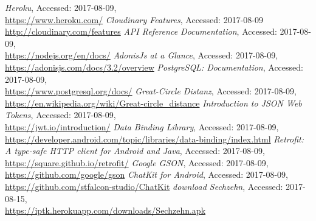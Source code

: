 \documentclass[11pt, accentcolor=tud1c]{tudreport}
\begin{document}
\begin{thebibliography}{9}
		\textit{Heroku}, 
		Accessed: 2017-08-09, \\
		\url{https://www.heroku.com/}
		\textit{Cloudinary Features}, 
		Accessed: 2017-08-09 \\
		\url{http://cloudinary.com/features}
		\textit{API Reference Documentation}, 
		Accessed: 2017-08-09, \\
		\url{https://nodejs.org/en/docs/}
		\textit{AdonisJs at a Glance}, 
		Accessed: 2017-08-09, \\
		\url{https://adonisjs.com/docs/3.2/overview}
		\textit{PostgreSQL: Documentation}, 
		Accessed: 2017-08-09, \\
		\url{https://www.postgresql.org/docs/}
		\textit{Great-Circle Distanz}, 
		Accessed: 2017-08-09, \\
		\url{https://en.wikipedia.org/wiki/Great-circle_distance}
		\textit{Introduction to JSON Web Tokens}, 
		Accessed: 2017-08-09, \\
		\url{https://jwt.io/introduction/}
		\textit{Data Binding Library}, 
		Accessed: 2017-08-09, \\
		\url{https://developer.android.com/topic/libraries/data-binding/index.html}
		\textit{Retrofit: A type-safe HTTP client for Android and Java}, 
		Accessed: 2017-08-09, \\	
		\url{https://square.github.io/retrofit/}
		\textit{Google GSON}, 
		Accessed: 2017-08-09, \\
		\url{https://github.com/google/gson}
		\textit{ChatKit for Android}, 
		Accessed: 2017-08-09, \\
		\url{https://github.com/stfalcon-studio/ChatKit}
		\textit{download Sechzehn}, 
		Accessed: 2017-08-15, \\
		\url{https://iptk.herokuapp.com/downloads/Sechzehn.apk}	
\end{thebibliography}
\end{document}
